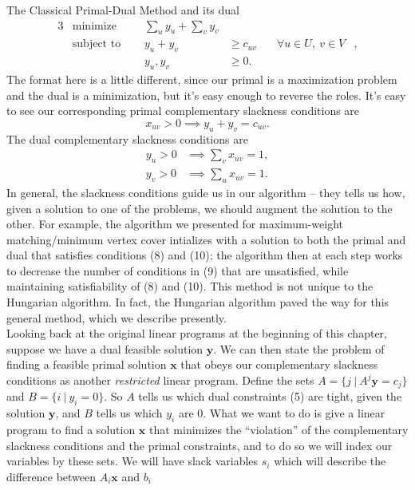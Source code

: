 \documentclass[11pt]{article}
\renewcommand{\'}{^{'}}
\begin{document}
\begin{section}{The Classical Primal-Dual Method}
	and its dual
	\begin{alignat}{3}
		& \text{minimize } & \sum_u y_u + \sum_v y_v& \\
		& \text{subject to } \quad & y_u + y_v & \geq c_{uv} & \quad \forall 
					u\in U,\ v\in V &, \\
				    && y_u,y_v & \geq 0.
	\end{alignat}
	The format here is a little different, since our primal is a maximization problem and the dual 
	is a minimization, but it's easy enough to reverse the roles. It's easy to see our 
	corresponding primal complementary slackness conditions are
	\begin{equation}
		x_{uv} > 0 \implies y_u + y_v = c_{uv}.
	\end{equation}
	The dual complementary slackness conditions are
	\begin{align}
		y_u > 0 &\implies \sum_v x_{uv} = 1,\\
		y_v > 0 &\implies \sum_u x_{uv} = 1.
	\end{align}
	In general, the slackness conditions guide us in our algorithm -- they tells us how, given a 
	solution to one of the problems, we should augment the solution to the other. For example, the 
	algorithm we presented for maximum-weight matching/minimum vertex cover intializes with 
	a solution to both the primal and dual that satisfies conditions (8) and (10); the algorithm 
	then at each step works to decrease the number of conditions in (9) that are unsatisfied, while 
	maintaining satisfiability of (8) and (10). This method is not unique to the Hungarian 
	algorithm. In fact, the Hungarian algorithm paved the way for this general method, which we 
	describe presently.\\
	Looking back at the original linear programs at the beginning of this chapter, suppose we have 
	a dual feasible solution $\mathbf{y}$. We can then state the problem of finding a feasible 
	primal solution $\mathbf{x}$ that obeys our complementary slackness conditions as another 
	\emph{restricted} linear program. Define the sets $A = \{j\ |\ A^{j}\mathbf{y} = c_j\}$ and 
	$B = \{i\ |\ y_i = 0\}$. So $A$ tells us which dual constraints (5) are tight, 
	given the solution $\mathbf{y}$, and $B$ tells us which $y_i$ are 0. What we want to do is 
	give a linear program to find a solution $\mathbf{x}$ that minimizes the 
	``violation'' of the complementary slackness conditions and the primal constraints, and to do 
	so we will index our variables by these sets. We will 
	have slack variables $s_i$ which will describe the difference between $A_i\mathbf{x}$ and $b_i$ 

\end{section}
\end{document}
